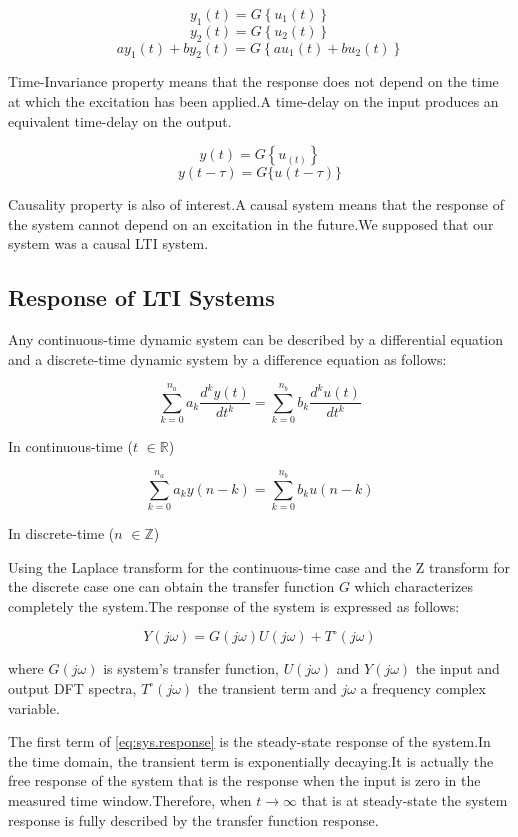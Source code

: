 \documentclass[a4paper,12pt]{article}
\numberwithin{equation}{section}
\begin{document}
\[y_{1}(t)=G\left\{u_{1}(t)\right\} \]
\[y_{2}(t)=G\left\{u_{2}(t)\right\} \]
\[a y_{1}(t)+b y_{2}(t)=G\left\{a u_{1}(t)+b u_{2}(t)\right\}\]

Time-Invariance property means that the response does not depend on the time at which the excitation has been applied.A time-delay on the input produces an equivalent
time-delay on the output.

\[y(t)=G\left\{u_(t)\right\} \]
\[y(t-\tau)=G\{u(t-\tau)\}\]

Causality property is also of interest.A causal system means that the response of the system cannot depend on an excitation in the future.We supposed that our system was a causal LTI system. 

\subsection{Response of LTI Systems}
Any  continuous-time dynamic system can be described by a differential equation and a discrete-time dynamic system by a difference equation as follows:



\[\sum_{k=0}^{n_{a}} a_{k} \frac{d^{k} y(t)}{d t^{k}}=\sum_{k=0}^{n_{b}} b_{k} \frac{d^{k} u(t)}{d t^{k}} \]

In continuous-time ($t$ $\in \mathbb{R}$)

\[\sum_{k=0}^{n_{a}} a_{k} y(n-k)=\sum_{k=0}^{n_{b}} b_{k} u(n-k)\]

In discrete-time  ($n$ $\in \mathbb{Z}$)


Using the Laplace transform for the continuous-time case and the Z transform for the discrete case one can obtain the transfer function $G$ which characterizes completely the system.The response of the system is expressed as follows:

\begin{equation}\label{eq:sys.response}
Y(j\omega)=G\left(j\omega\right) U(j \omega)+T^{\circ}(j\omega)
\end{equation}

where $G\left(j\omega\right)$ is system's transfer function, $U(j \omega)$ and $Y(j\omega)$ the input and output DFT spectra, $T^{\circ}(j\omega)$ the transient term and $j \omega$ a frequency complex variable.

The first term of \eqref{eq:sys.response} is the steady-state response of the system.In the time domain, the transient term is exponentially decaying.It is actually the free response of the system that is the response when the input is zero in the measured time window.Therefore, when $t\rightarrow \infty$ that is at steady-state the system response is fully described by the transfer function response.
\end{document}
